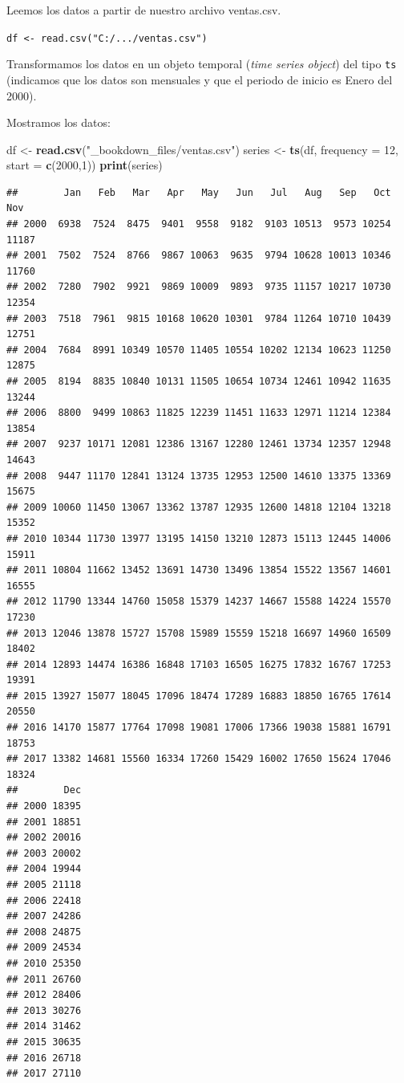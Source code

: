 \documentclass[]{book}
\newenvironment{Shaded}{\begin{snugshade}}{\end{snugshade}}
\newcommand{\DataTypeTok}[1]{\textcolor[rgb]{0.13,0.29,0.53}{#1}}
\newcommand{\DecValTok}[1]{\textcolor[rgb]{0.00,0.00,0.81}{#1}}
\newcommand{\KeywordTok}[1]{\textcolor[rgb]{0.13,0.29,0.53}{\textbf{#1}}}
\newcommand{\NormalTok}[1]{#1}
\newcommand{\StringTok}[1]{\textcolor[rgb]{0.31,0.60,0.02}{#1}}
\theoremstyle{definition}
\theoremstyle{definition}
\theoremstyle{definition}
\theoremstyle{remark}
\begin{document}
Leemos los datos a partir de nuestro archivo ventas.csv.

\texttt{df\ \textless{}-\ read.csv("C:/.../ventas.csv")}

Transformamos los datos en un objeto temporal (\emph{time series
object}) del tipo \texttt{ts} (indicamos que los datos son mensuales y
que el periodo de inicio es Enero del 2000).

Mostramos los datos:

\begin{Shaded}
\begin{Highlighting}[]
\NormalTok{df <-}\StringTok{ }\KeywordTok{read.csv}\NormalTok{(}\StringTok{"_bookdown_files/ventas.csv"}\NormalTok{)}
\NormalTok{series <-}\StringTok{ }\KeywordTok{ts}\NormalTok{(df, }\DataTypeTok{frequency =} \DecValTok{12}\NormalTok{, }\DataTypeTok{start =} \KeywordTok{c}\NormalTok{(}\DecValTok{2000}\NormalTok{,}\DecValTok{1}\NormalTok{))}
\KeywordTok{print}\NormalTok{(series)}
\end{Highlighting}
\end{Shaded}

\begin{verbatim}
##        Jan   Feb   Mar   Apr   May   Jun   Jul   Aug   Sep   Oct   Nov
## 2000  6938  7524  8475  9401  9558  9182  9103 10513  9573 10254 11187
## 2001  7502  7524  8766  9867 10063  9635  9794 10628 10013 10346 11760
## 2002  7280  7902  9921  9869 10009  9893  9735 11157 10217 10730 12354
## 2003  7518  7961  9815 10168 10620 10301  9784 11264 10710 10439 12751
## 2004  7684  8991 10349 10570 11405 10554 10202 12134 10623 11250 12875
## 2005  8194  8835 10840 10131 11505 10654 10734 12461 10942 11635 13244
## 2006  8800  9499 10863 11825 12239 11451 11633 12971 11214 12384 13854
## 2007  9237 10171 12081 12386 13167 12280 12461 13734 12357 12948 14643
## 2008  9447 11170 12841 13124 13735 12953 12500 14610 13375 13369 15675
## 2009 10060 11450 13067 13362 13787 12935 12600 14818 12104 13218 15352
## 2010 10344 11730 13977 13195 14150 13210 12873 15113 12445 14006 15911
## 2011 10804 11662 13452 13691 14730 13496 13854 15522 13567 14601 16555
## 2012 11790 13344 14760 15058 15379 14237 14667 15588 14224 15570 17230
## 2013 12046 13878 15727 15708 15989 15559 15218 16697 14960 16509 18402
## 2014 12893 14474 16386 16848 17103 16505 16275 17832 16767 17253 19391
## 2015 13927 15077 18045 17096 18474 17289 16883 18850 16765 17614 20550
## 2016 14170 15877 17764 17098 19081 17006 17366 19038 15881 16791 18753
## 2017 13382 14681 15560 16334 17260 15429 16002 17650 15624 17046 18324
##        Dec
## 2000 18395
## 2001 18851
## 2002 20016
## 2003 20002
## 2004 19944
## 2005 21118
## 2006 22418
## 2007 24286
## 2008 24875
## 2009 24534
## 2010 25350
## 2011 26760
## 2012 28406
## 2013 30276
## 2014 31462
## 2015 30635
## 2016 26718
## 2017 27110
\end{verbatim}
\end{document}
